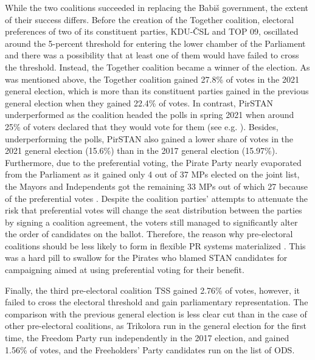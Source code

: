 \documentclass[fignum,12pt,titlepage]{article}
\begin{document}
While the two coalitions succeeded in replacing the Babiš government, the extent of their success differs. Before the creation of the Together coalition, electoral preferences of two of its constituent parties, KDU-ČSL and TOP 09, oscillated around the 5-percent threshold for entering the lower chamber of the Parliament and there was a possibility that at least one of them would have failed to cross the threshold. Instead, the Together coalition became a winner of the election. As was mentioned above, the Together coalition gained 27.8\% of votes in the 2021 general election, which is more than its constituent parties gained in the previous general election when they gained 22.4\% of votes. 
In contrast, PirSTAN underperformed as the coalition headed the polls in spring 2021 when around 25\% of voters declared that they would vote for them (see e.g. \cite{linek2022}). Besides, underperforming the polls, PirSTAN also gained a lower share of votes in the 2021 general election (15.6\%) than in the 2017 general election (15.97\%).
Furthermore, due to the preferential voting, the Pirate Party nearly evaporated from the Parliament as it gained only 4 out of 37 MPs elected on the joint list, the Mayors and Independents got the remaining 33 MPs out of which 27 because of the preferential votes \parencite[15]{maskarinec2022}. Despite the coalition parties' attempts to attenuate the risk that preferential votes will change the seat distribution between the parties by signing a coalition agreement, the voters still managed to significantly alter the order of candidates on the ballot. Therefore, the reason why pre-electoral coalitions should be less likely to form in flexible PR systems materialized \parencite{ibenskas2016}. This was a hard pill to swallow for the Pirates who blamed STAN candidates for campaigning aimed at using preferential voting for their benefit. 

Finally, the third pre-electoral coalition TSS gained 2.76\% of votes, however, it failed to cross the electoral threshold and gain parliamentary representation. The comparison with the previous general election is less clear cut than in the case of other pre-electoral coalitions, as Trikolora run in the general election for the first time, the Freedom Party run independently in the 2017 election, and gained 1.56\% of votes, and the Freeholders' Party candidates run on the list of ODS.
\end{document}
